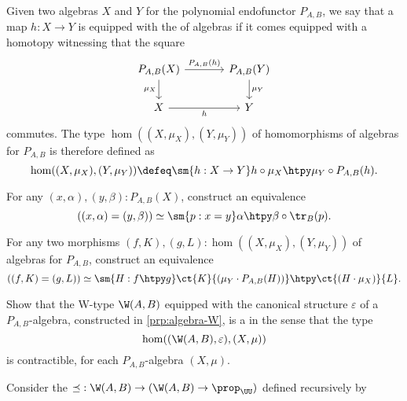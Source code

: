 \begin{exercises}
  Given two algebras $X$ and $Y$ for the polynomial endofunctor $P_{A,B}$, we say that a map $h:X\to Y$ is equipped with the  of algebras if it comes equipped with a homotopy witnessing that the square
  \begin{equation*}
    \begin{tikzcd}[column sep=large]
      P_{A,B}(X) \arrow[d,swap,"\mu_X"] \arrow[r,"P_{A,B}(h)"] & P_{A,B}(Y) \arrow[d,"\mu_Y"] \\
      X \arrow[r,swap,"h"] & Y
    \end{tikzcd}
  \end{equation*}
  commutes. The type $\hom((X,\mu_X),(Y,\mu_Y))$ of homomorphisms of algebras for $P_{A,B}$ is therefore defined as
  \begin{equation*}
    \hom((X,\mu_X),(Y,\mu_Y))\defeq \sm{h:X\to Y}h\circ\mu_X\htpy \mu_Y\circ P_{A,B}(h).
  \end{equation*}
  \begin{subexenum}
  \item For any $(x,\alpha),(y,\beta):P_{A,B}(X)$, construct an equivalence
    \begin{equation*}
      ((x,\alpha)=(y,\beta)) \simeq \sm{p:x=y}\alpha\htpy \beta\circ\tr_B(p).
    \end{equation*}
  \item For any two morphisms $(f,K),(g,L):\hom((X,\mu_X),(Y,\mu_Y))$ of algebras for $P_{A,B}$, construct an equivalence
    \begin{equation*}
      ((f,K)=(g,L))\simeq \sm{H:f\htpy g} \ct{K}{(\mu_Y\cdot P_{A,B}(H))}\htpy \ct{(H\cdot \mu_X)}{L}.
    \end{equation*}
  \item Show that the W-type $\W(A,B)$ equipped with the canonical structure $\varepsilon$ of a $P_{A,B}$-algebra, constructed in \cref{prp:algebra-W}, is a  in the sense that the type
    \begin{equation*}
      \hom((\W(A,B),\varepsilon),(X,\mu))
    \end{equation*}
    is contractible, for each $P_{A,B}$-algebra $(X,\mu)$.
  \end{subexenum}
  \exitem Consider the  ${\preceq} : \W(A,B)\to (\W(A,B)\to\prop_\UU)$ defined recursively by

\end{exercises}
